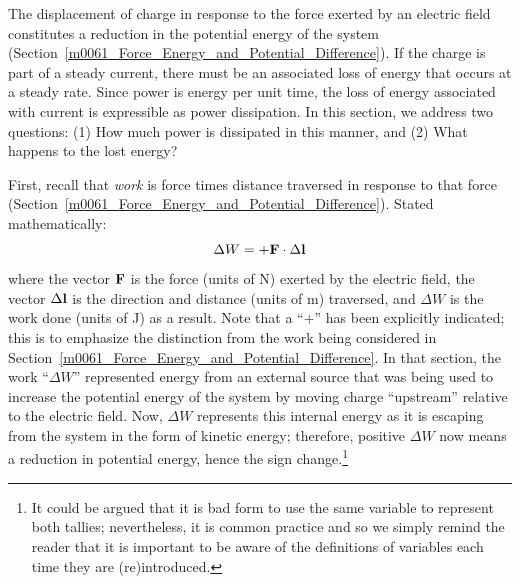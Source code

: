 

\label{m0106_Power_Dissipation_in_Conducting_Media} %

The displacement of charge in response to the force exerted by an electric field constitutes a reduction in the potential energy of the system (Section~\ref{m0061_Force_Energy_and_Potential_Difference}).
If the charge is part of a steady current, there must be an associated loss of energy that occurs at a steady rate.  
Since power is energy per unit time, the loss of energy associated with current is expressible as power dissipation.
In this section, we address two questions: 
(1) How much power is dissipated in this manner, and
(2) What happens to the lost energy?

First, recall that \emph{work} is force times distance traversed in response to that force (Section~\ref{m0061_Force_Energy_and_Potential_Difference}).  
Stated mathematically:
%
\begin{equation}
\Delta W = +{\bf F}\cdot \Delta {\bf l}
\end{equation}
%
where the vector ${\bf F}$ is the force (units of N) exerted by the electric field, 
the vector $\Delta {\bf l}$ is the direction and distance (units of m) traversed, and
$\Delta W$ is the work done (units of J) as a result. 
Note that a ``$+$'' has been explicitly indicated; this is to emphasize the distinction from the work being considered in Section~\ref{m0061_Force_Energy_and_Potential_Difference}.  In that section, the work ``$\Delta W$'' represented energy from an external source that was being used to increase the potential energy of the system by moving charge ``upstream'' relative to the electric field. 
Now, $\Delta W$ represents this internal energy as it is escaping from the system in the form of kinetic energy; therefore, positive $\Delta W$ now means a reduction in potential energy, hence the sign change.\footnote{It could be argued that it is bad form to use the same variable to represent both tallies; nevertheless, it is common practice and so we simply remind the reader that it is important to be aware of the definitions of variables each time they are (re)introduced.}

